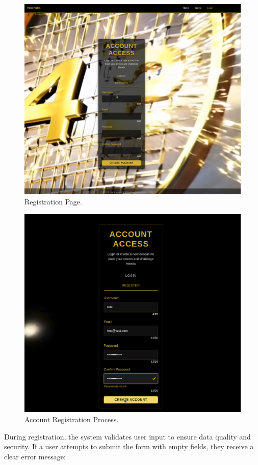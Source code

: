 \begin{figure}[H]
    \centering
    \includegraphics[width=0.7\linewidth]{Figures/images/new_images/RegistrationPage.png}
    \caption{Registration Page.} %
    \label{fig:registration-page}
\end{figure}

\begin{figure}[H]
    \centering
    \includegraphics[width=0.7\linewidth]{Figures/images/new_images/RegisteringAccount.png}
    \caption{Account Registration Process.} %
    \label{fig:registering-account}
\end{figure}

During registration, the system validates user input to ensure data quality and security. If a user attempts to submit the form with empty fields, they receive a clear error message:

